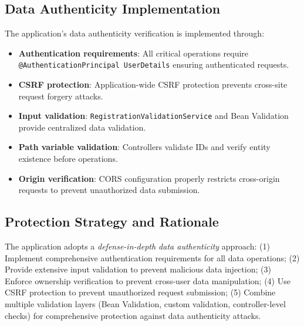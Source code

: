 \documentclass[]{UCD_CS_FYP_Report}
\begin{document}
\subsection{Data Authenticity Implementation}
The application's data authenticity verification is implemented through:
\begin{itemize}
	\item \textbf{Authentication requirements}: All critical operations require \texttt{@AuthenticationPrincipal UserDetails} ensuring authenticated requests.
	\item \textbf{CSRF protection}: Application-wide CSRF protection prevents cross-site request forgery attacks.
	\item \textbf{Input validation}: \texttt{RegistrationValidationService} and Bean Validation provide centralized data validation.
	\item \textbf{Path variable validation}: Controllers validate IDs and verify entity existence before operations.
	\item \textbf{Origin verification}: CORS configuration properly restricts cross-origin requests to prevent unauthorized data submission.
\end{itemize}

\subsection{Protection Strategy and Rationale}
The application adopts a \textit{defense-in-depth data authenticity} approach: (1) Implement comprehensive authentication requirements for all data operations; (2) Provide extensive input validation to prevent malicious data injection; (3) Enforce ownership verification to prevent cross-user data manipulation; (4) Use CSRF protection to prevent unauthorized request submission; (5) Combine multiple validation layers (Bean Validation, custom validation, controller-level checks) for comprehensive protection against data authenticity attacks.
\end{document}
